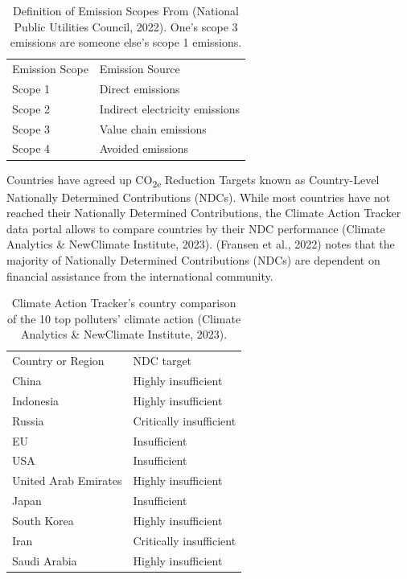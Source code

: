 \documentclass[
  12pt,
  letterpaper,
  DIV=11,
  numbers=noendperiod]{scrartcl}
\begin{document}
\def\pandoctableshortcapt{Definition of Emission Scopes}

\begin{longtable}[]{@{}ll@{}}
\caption[Definition of Emission Scopes]{Definition of Emission Scopes
From (National Public Utilities Council, 2022). One's scope 3 emissions
are someone else's scope 1 emissions.}\tabularnewline
\toprule\noalign{}
\endfirsthead
\endhead
\bottomrule\noalign{}
\endlastfoot
Emission Scope & Emission Source \\
Scope 1 & Direct emissions \\
Scope 2 & Indirect electricity emissions \\
Scope 3 & Value chain emissions \\
Scope 4 & Avoided emissions \\
\end{longtable}

\let\pandoctableshortcapt\relax

Countries have agreed up CO\textsubscript{2e} Reduction Targets known as
Country-Level Nationally Determined Contributions (NDCs). While most
countries have not reached their Nationally Determined Contributions,
the Climate Action Tracker data portal allows to compare countries by
their NDC performance (Climate Analytics \& NewClimate Institute, 2023).
(Fransen et al., 2022) notes that the majority of Nationally Determined
Contributions (NDCs) are dependent on financial assistance from the
international community.

\def\pandoctableshortcapt{Top Polluters}

\begin{longtable}[]{@{}ll@{}}
\caption[Top Polluters]{Climate Action Tracker's country comparison of
the 10 top polluters' climate action (Climate Analytics \& NewClimate
Institute, 2023).}\tabularnewline
\toprule\noalign{}
\endfirsthead
\endhead
\bottomrule\noalign{}
\endlastfoot
Country or Region & NDC target \\
China & Highly insufficient \\
Indonesia & Highly insufficient \\
Russia & Critically insufficient \\
EU & Insufficient \\
USA & Insufficient \\
United Arab Emirates & Highly insufficient \\
Japan & Insufficient \\
South Korea & Highly insufficient \\
Iran & Critically insufficient \\
Saudi Arabia & Highly insufficient \\
\end{longtable}
\end{document}
